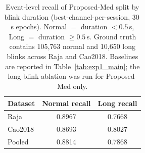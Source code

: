 \begin{table}[ht]
  \centering
  \caption{Event-level recall of Proposed-Med split by blink duration (best-channel-per-session, 30\,s epochs). Normal $=$ duration $<0.5$\,s, Long $=$ duration $\geq0.5$\,s. Ground truth contains 105{,}763 normal and 10{,}650 long blinks across Raja and Cao2018. Baselines are reported in Table~\ref{tab:exp1_main}; the long-blink ablation was run for Proposed-Med only.}
  \label{tab:blink_type_recall}
  \begin{tabular}{lcc}
    \toprule
    Dataset & Normal recall & Long recall \\
    \midrule
    Raja & 0.8967 & 0.7668 \\
    Cao2018 & 0.8693 & 0.8027 \\
    \midrule
    Pooled & 0.8814 & 0.7868 \\
    \bottomrule
  \end{tabular}
\end{table}
